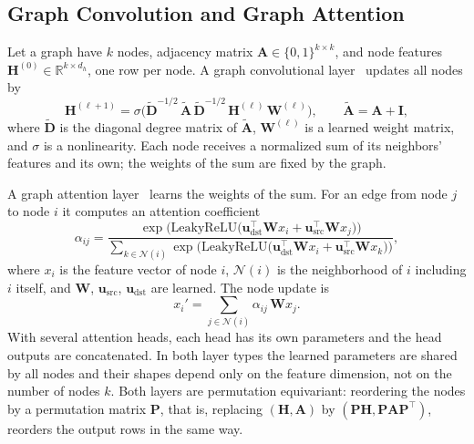 \subsection{Graph Convolution and Graph Attention}
\label{subsec:gnn-background}
Let a graph have $k$ nodes, adjacency matrix $\mathbf{A}\in\{0,1\}^{k\times k}$, and node
features $\mathbf{H}^{(0)}\in\mathbb{R}^{k\times d_h}$, one row per node. A graph
convolutional layer~\cite{gcn} updates all nodes by
\begin{equation}
\label{eq:gcn}
\mathbf{H}^{(\ell+1)} = \sigma\!\Big(\tilde{\mathbf{D}}^{-1/2}\,\tilde{\mathbf{A}}\,
\tilde{\mathbf{D}}^{-1/2}\,\mathbf{H}^{(\ell)}\,\mathbf{W}^{(\ell)}\Big),
\qquad \tilde{\mathbf{A}} = \mathbf{A} + \mathbf{I},
\end{equation}
where $\tilde{\mathbf{D}}$ is the diagonal degree matrix of $\tilde{\mathbf{A}}$,
$\mathbf{W}^{(\ell)}$ is a learned weight matrix, and $\sigma$ is a nonlinearity. Each node
receives a normalized sum of its neighbors' features and its own; the weights of the sum
are fixed by the graph.

A graph attention layer~\cite{gat} learns the weights of the sum. For an edge from node $j$
to node $i$ it computes an attention coefficient
\begin{equation}
\label{eq:gat-alpha}
\alpha_{ij} = \frac{\exp\!\big(\mathrm{LeakyReLU}\big(\mathbf{u}_{\text{dst}}^{\top}\mathbf{W}x_i
+ \mathbf{u}_{\text{src}}^{\top}\mathbf{W}x_j\big)\big)}
{\sum_{k\in\mathcal{N}(i)}\exp\!\big(\mathrm{LeakyReLU}\big(\mathbf{u}_{\text{dst}}^{\top}\mathbf{W}x_i
+ \mathbf{u}_{\text{src}}^{\top}\mathbf{W}x_k\big)\big)},
\end{equation}
where $x_i$ is the feature vector of node $i$, $\mathcal{N}(i)$ is the neighborhood of $i$
including $i$ itself, and $\mathbf{W}$, $\mathbf{u}_{\text{src}}$, $\mathbf{u}_{\text{dst}}$
are learned. The node update is
\begin{equation}
\label{eq:gat}
x_i' = \sum_{j\in\mathcal{N}(i)} \alpha_{ij}\,\mathbf{W}x_j .
\end{equation}
With several attention heads, each head has its own parameters and the head outputs are
concatenated. In both layer types the learned parameters are shared by all nodes and their
shapes depend only on the feature dimension, not on the number of nodes $k$. Both layers
are permutation equivariant: reordering the nodes by a permutation matrix $\mathbf{P}$, that
is, replacing $(\mathbf{H},\mathbf{A})$ by $(\mathbf{P}\mathbf{H},\mathbf{P}\mathbf{A}\mathbf{P}^{\top})$,
reorders the output rows in the same way.
